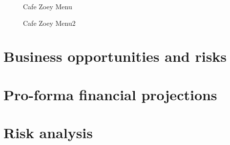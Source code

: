 \documentclass{article}
\begin{document}
\begin{figure}[h!]
	\caption{Cafe Zoey Menu}
\end{figure}


\begin{figure}[h!]
	\caption{Cafe Zoey Menu2}
\end{figure}


\section{Business opportunities and risks}
\section{Pro-forma financial projections}
\section{Risk analysis}
\end{document}
